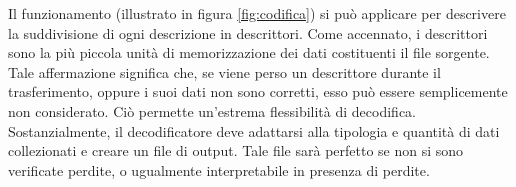 Il funzionamento (illustrato in figura \ref{fig:codifica}) si può applicare per
descrivere la suddivisione di ogni descrizione in descrittori. Come accennato, i descrittori sono la più
piccola unità di memorizzazione dei dati costituenti il file sorgente. Tale
affermazione significa che, se viene perso un descrittore durante il
trasferimento, oppure i suoi dati non sono corretti, esso può essere
semplicemente non considerato. Ciò permette un'estrema flessibilità di
decodifica. Sostanzialmente, il decodificatore deve adattarsi alla tipologia e
quantità di dati collezionati e creare un file di output. Tale file sarà perfetto se non si sono verificate perdite, o ugualmente interpretabile in presenza di perdite.
